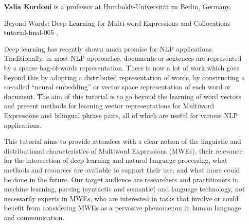 \begin{bio}
  {\bfseries Valia Kordoni} is a professor at Humboldt-Universität zu Berlin,
  Germany. 

\end{bio}

\begin{tutorial}
  {Beyond Words: Deep Learning for Multi-word Expressions and Collocations}
  {tutorial-final-005}
  {\daydateyear, \tutorialafternoontime}
  {\TutLocE}

Deep learning has recently shown much promise for NLP applications.
Traditionally, in most NLP approaches, documents or sentences are represented
by a sparse bag-of-words representation. There is now a lot of work which goes
beyond this by adopting a distributed representation of words, by constructing
a so-called ``neural embedding'' or vector space representation of each word or
document. The aim of this tutorial is to go beyond the learning of word
vectors and present methods for learning vector representations for Multiword
Expressions and bilingual phrase pairs, all of which are useful for various NLP
applications.

This tutorial aims to provide attendees with a clear notion of the linguistic
and distributional characteristics of Multiword Expressions (MWEs), their
relevance for the intersection of deep learning and natural language
processing, what methods and resources are available to support their use, and
what more could be done in the future. Our target audience are researchers and
practitioners in machine learning, parsing (syntactic and semantic) and
language technology, not necessarily experts in MWEs, who are interested in
tasks that involve or could benefit from considering MWEs as a pervasive
phenomenon in human language and communication.

\end{tutorial}